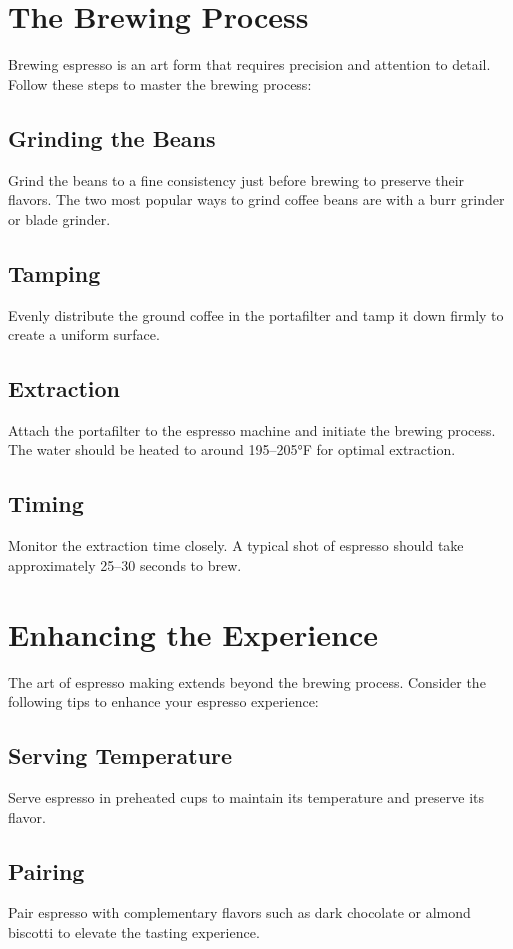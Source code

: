 \documentclass[12pt,a4paper]{article}
\begin{document}
\section{The Brewing Process}
Brewing espresso is an art form that requires precision and attention to detail. Follow these steps to master the brewing process:
\begin{multicols}{2}
\subsection{Grinding the Beans}
Grind the beans to a fine consistency just before brewing to preserve their flavors. The two most popular ways to grind coffee beans are with a burr grinder or blade grinder.
\subsection{Tamping}
Evenly distribute the ground coffee in the portafilter and tamp it down firmly to create a uniform surface.
\columnbreak
\subsection{Extraction}
Attach the portafilter to the espresso machine and initiate the brewing process. The water should be heated to around 195--205°F for optimal extraction.
\subsection{Timing}
Monitor the extraction time closely. A typical shot of espresso should take approximately 25--30 seconds to brew.
\end{multicols}
\section{Enhancing the Experience}
The art of espresso making extends beyond the brewing process. Consider the following tips to enhance your espresso experience:
\subsection{Serving Temperature}
Serve espresso in preheated cups to maintain its temperature and preserve its flavor.
\subsection{Pairing}
Pair espresso with complementary flavors such as dark chocolate or almond biscotti to elevate the tasting experience.
\end{document}
